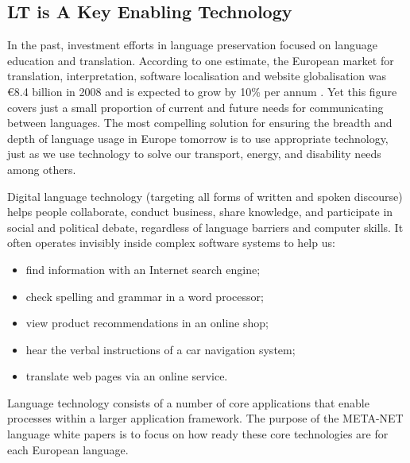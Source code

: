 \begin{multicols}{2}
\subsection[Language Technology is a Key Enabling Technology]{LT is A Key Enabling Technology}

In the past, investment efforts in language preservation focused on language education and translation.
According to one estimate, the European market for translation, interpretation, software localisation and website globalisation was €8.4 billion in 2008 and is expected to grow by 10\% per annum \cite{Meta51}.
Yet this figure covers just a small proportion of current and future needs for communicating between languages.
The most compelling solution for ensuring the breadth and depth of language usage in Europe tomorrow is to use appropriate technology, just as we use technology to solve our transport, energy, and disability needs among others.


Digital language technology (targeting all forms of written and spoken discourse) helps people collaborate, conduct business, share knowledge, and participate in social and political debate, regardless of language barriers and computer skills.
It often operates invisibly inside complex software systems to help us:

\begin{itemize}
\item  find information with an Internet search engine;
\item  check spelling and grammar in a word processor;
\item  view product recommendations in an online shop;
\item  hear the verbal instructions of a car navigation system;
\item  translate web pages via an online service.
\end{itemize}

Language technology consists of a number of core applications that enable processes within a larger application framework.  The purpose of the META-NET language white papers is to focus on how ready these core technologies are for each European language.



\end{multicols}

